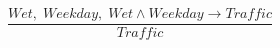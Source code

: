 \documentclass[preview,border=4pt]{standalone}
\begin{document}
\[
\frac{Wet,\; Weekday,\; Wet \land Weekday \rightarrow Traffic}{Traffic}
\]
\end{document}
